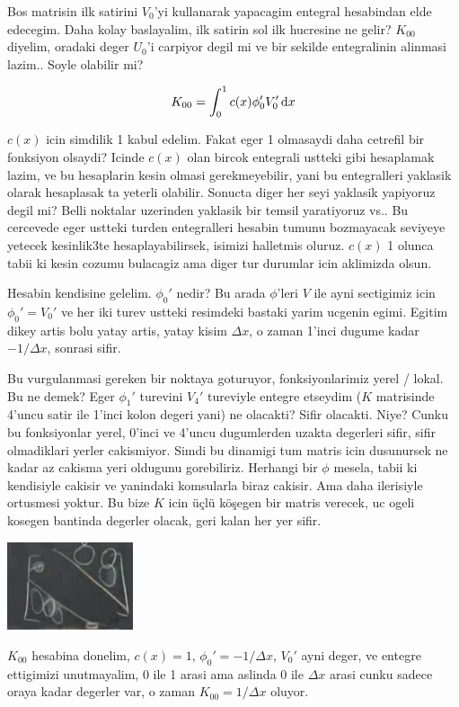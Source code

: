 \documentclass[12pt,fleqn]{article}\usepackage{../../common}
\begin{document}
Bos matrisin ilk satirini $V_0$'yi kullanarak yapacagim entegral hesabindan elde
edecegim. Daha kolay baslayalim, ilk satirin sol ilk hucresine ne gelir?
$K_{00}$ diyelim, oradaki deger $U_0$'i carpiyor degil mi ve bir sekilde
entegralinin alinmasi lazim.. Soyle olabilir mi?

$$
K_{00} = \int _{0}^{1} c(x) \phi_0' V_0' \,\mathrm{d} x
$$

$c(x)$ icin simdilik 1 kabul edelim. Fakat eger 1 olmasaydi daha cetrefil bir
fonksiyon olsaydi? Icinde $c(x)$ olan bircok entegrali ustteki gibi hesaplamak
lazim, ve bu hesaplarin kesin olmasi gerekmeyebilir, yani bu entegralleri
yaklasik olarak hesaplasak ta yeterli olabilir. Sonucta diger her seyi yaklasik
yapiyoruz degil mi? Belli noktalar uzerinden yaklasik bir temsil yaratiyoruz
vs.. Bu cercevede eger ustteki turden entegralleri hesabin tumunu bozmayacak
seviyeye yetecek kesinlik3te hesaplayabilirsek, isimizi halletmis oluruz. $c(x)$
1 olunca tabii ki kesin cozumu bulacagiz ama diger tur durumlar icin aklimizda
olsun.

Hesabin kendisine gelelim. $\phi_0'$ nedir? Bu arada $\phi$'leri $V$ ile ayni
sectigimiz icin $\phi_0' = V_0'$ ve her iki turev ustteki resimdeki bastaki
yarim ucgenin egimi. Egitim dikey artis bolu yatay artis, yatay kisim $\Delta
x$, o zaman 1'inci dugume kadar $- 1 / \Delta x$, sonrasi sifir.

Bu vurgulanmasi gereken bir noktaya goturuyor, fonksiyonlarimiz yerel / lokal.
Bu ne demek? Eger $\phi_1'$ turevini $V_4'$ tureviyle entegre etseydim ($K$
matrisinde 4'uncu satir ile 1'inci kolon degeri yani) ne olacakti? Sifir
olacakti. Niye? Cunku bu fonksiyonlar yerel, 0'inci ve 4'uncu dugumlerden uzakta
degerleri sifir, sifir olmadiklari yerler cakismiyor. Simdi bu dinamigi tum
matris icin dusunursek ne kadar az cakisma yeri oldugunu gorebiliriz. Herhangi
bir $\phi$ mesela, tabii ki kendisiyle cakisir ve yanindaki komsularla biraz
cakisir. Ama daha ilerisiyle ortusmesi yoktur. Bu bize $K$ icin üçlü köşegen bir
matris verecek, uc ogeli kosegen bantinda degerler olacak, geri kalan her yer
sifir.

\includegraphics[width=10em]{compscieng_1_18_06.png}

$K_{00}$ hesabina donelim, $c(x)=1$, $\phi_0' = -1/\Delta x$, $V_0'$ ayni deger,
ve entegre ettigimizi unutmayalim, 0 ile 1 arasi ama aslinda 0 ile $\Delta x$
arasi cunku sadece oraya kadar degerler var, o zaman $K_{00} = 1/\Delta x$
oluyor.
\end{document}
